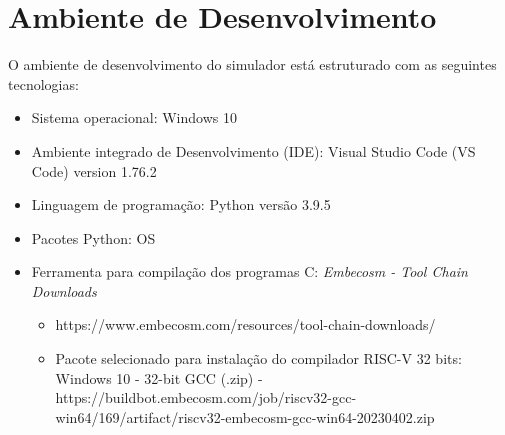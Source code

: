 
\section{Ambiente de Desenvolvimento}

O ambiente de desenvolvimento do simulador está estruturado com as seguintes tecnologias:

\begin{itemize}
    \item Sistema operacional: Windows 10
    \item Ambiente integrado de Desenvolvimento (IDE): Visual Studio Code (VS Code) version 1.76.2
    \item Linguagem de programação: Python versão 3.9.5
    \item Pacotes Python: OS 
    \item Ferramenta para compilação dos programas C: \textit{Embecosm - Tool Chain Downloads}
    \begin{itemize}
        \item https://www.embecosm.com/resources/tool-chain-downloads/
        \item Pacote selecionado para instalação do compilador RISC-V 32 bits: Windows 10 - 32-bit GCC (.zip) - https://buildbot.embecosm.com/job/riscv32-gcc-win64/169/artifact/riscv32-embecosm-gcc-win64-20230402.zip
    \end{itemize}    
\end{itemize}
